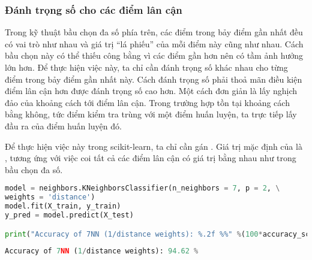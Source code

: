 




\subsubsection{Đánh trọng số cho các điểm lân cận}
Trong kỹ thuật bầu chọn đa số phía trên, các điểm trong bảy điểm gần nhất đều có
vai trò như nhau và giá trị ``lá phiếu'' của mỗi điểm này cũng như nhau. Cách bầu chọn này có thể thiếu công bằng vì các điểm gần hơn nên có tầm ảnh hưởng lớn hơn. Để thực hiện việc này, ta chỉ cần đánh trọng số khác nhau cho từng điểm trong bảy điểm gần nhất này. Cách
đánh trọng số phải thoả mãn điều kiện điểm lân cận hơn được đánh trọng số cao hơn. Một cách đơn giản là lấy nghịch đảo của khoảng
cách tới điểm lân cận. Trong trường hợp tồn tại khoảng cách bằng không, tức điểm kiểm tra trùng với một điểm huấn luyện, ta trực tiếp lấy đầu ra của điểm huấn luyện đó.

Để thực hiện việc này trong scikit-learn, ta chỉ cần gán
. Giá trị mặc định của
 là , tương ứng với việc coi tất
cả các điểm lân cận có giá trị bằng nhau như trong bầu chọn đa số.

\begin{lstlisting}[language=Python]
model = neighbors.KNeighborsClassifier(n_neighbors = 7, p = 2, \
weights = 'distance')
model.fit(X_train, y_train)
y_pred = model.predict(X_test)

print("Accuracy of 7NN (1/distance weights): %.2f %%" %(100*accuracy_score(y_test, y_pred)))
\end{lstlisting}
\kq
\begin{lstlisting}[language=Python]
Accuracy of 7NN (1/distance weights): 94.62 %
\end{lstlisting}



